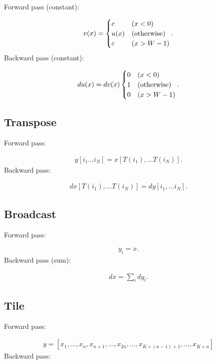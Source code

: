 \documentclass{article}
\begin{document}
Forward pass (constant):

\begin{eqnarray}
  v(x) = \begin{cases}
    c & (x < 0) \\
    u(x) & ({\rm otherwise}) \\
    c & (x > W - 1)
    \end{cases}.
\end{eqnarray}
%
Backward pass (constant):

\begin{eqnarray}
  du(x) = dv(x) \begin{cases}
    0 & (x < 0) \\
    1 & ({\rm otherwise}) \\
    0 & (x > W - 1)
    \end{cases}.
\end{eqnarray}


\subsection{Transpose}

Forward pass:

\begin{eqnarray}
  y[i_1\ldots i_N] = x[T(i_1), \ldots T(i_N)].
\end{eqnarray}
%
Backward pass:

\begin{eqnarray}
  dx[T(i_1), \ldots T(i_N)] = dy[i_1, \ldots i_N].
\end{eqnarray}


\subsection{Broadcast}

Forward pass:

\begin{eqnarray}
  y_i = x.
\end{eqnarray}
%
Backward pass (sum):

\begin{eqnarray}
  dx = \sum_i dy_i.
\end{eqnarray}


\subsection{Tile}

Forward pass:

\begin{eqnarray}
  y = [x_1, \ldots, x_n, x_{n+1}, \ldots, x_{2n}, \ldots, x_{K \times (n-1) + 1}, \ldots, x_{K \times n}]
\end{eqnarray}
%
Backward pass:
\end{document}
